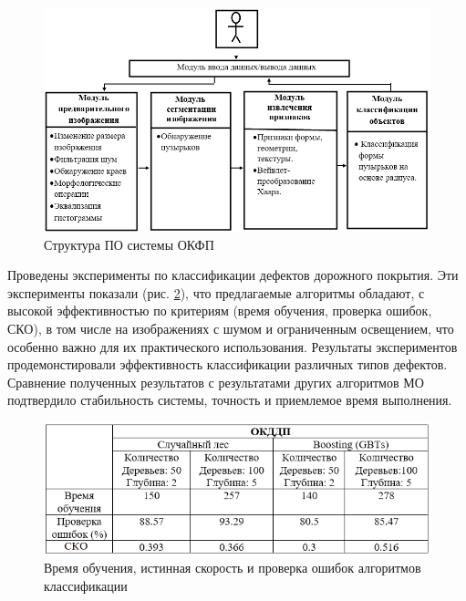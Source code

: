 \begin{figure}[ht!]
\centering
\vspace{-0.8em}
\includegraphics [width=1\linewidth]{images/pic59.png}
\caption{Структура ПО системы ОКФП} \label{pic59}
\end{figure}

Проведены эксперименты по классификации дефектов дорожного покрытия. Эти эксперименты показали (рис. \ref{pic1}), что предлагаемые алгоритмы обладают, с высокой эффективностью по критериям (время обучения, проверка ошибок, СКО), в том числе на изображениях с шумом и ограниченным освещением, что особенно важно для их практического использования. Результаты экспериментов продемонстировали эффективность классификации различных типов дефектов. Сравнение полученных результатов с результатами других алгоритмов МО подтвердило стабильность системы, точность и приемлемое время выполнения.
\begin{figure}[ht!]
\centering
\vspace{-0.8em}
\includegraphics [width=1\linewidth]{images/pic1.png}
\caption{Время обучения, истинная скорость и проверка ошибок алгоритмов классификации} \label{pic1}
\vspace{-0.8em}
\end{figure}

